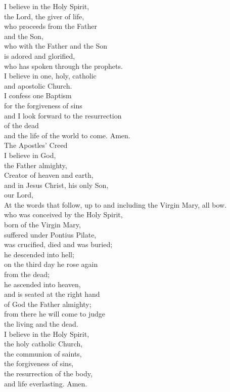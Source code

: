 \documentclass[10pt,a5]{article}
\begin{document}
\begin{paracol}{2}
\noindent
I believe in the Holy Spirit,\\
the Lord, the giver of life,\\
who proceeds from the Father\\
and the Son,\\
who with the Father and the Son\\
is adored and glorified,\\
who has spoken through the prophets.\\

\noindent
I believe in one, holy, catholic\\
and apostolic Church.\\
I confess one Baptism\\
for the forgiveness of sins\\
and I look forward to the resurrection\\
of the dead\\
and the life of the world to come. Amen.\\
The Apostles’ Creed\\
I believe in God,\\
the Father almighty,\\
Creator of heaven and earth,\\
and in Jesus Christ, his only Son,\\
our Lord,\\
{\tiny At the words that follow, up to and including the Virgin Mary, all bow.}\\
who was conceived by the Holy Spirit,\\
born of the Virgin Mary,\\
suffered under Pontius Pilate,\\
was crucified, died and was buried;\\
he descended into hell;\\
on the third day he rose again\\
from the dead;\\
he ascended into heaven,\\
and is seated at the right hand\\
of God the Father almighty;\\
from there he will come to judge\\
the living and the dead.\\
I believe in the Holy Spirit,\\
the holy catholic Church,\\
the communion of saints,\\
the forgiveness of sins,\\
the resurrection of the body,\\
and life everlasting. Amen.


\end{paracol}
\end{document}
